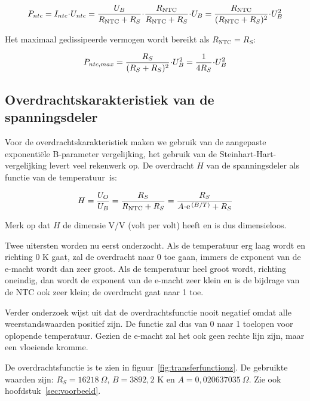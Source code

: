 \documentclass[12pt,a4paper,final,twoside,fleqn]{article}
\newcommand{\rntc}{R_\text{NTC}}
\let\oldcdot\cdot
\renewcommand{\cdot}{\kern-.10em\oldcdot\kern-.10em}
\begin{document}
\begin{equation}
P_{ntc} = I_{ntc}\cdot U_{ntc} = \dfrac{U_B}{\rntc+R_S}\cdot \dfrac{\rntc}{\rntc+R_S}\cdot U_B = \dfrac{\rntc}{(\rntc+R_S)^2}\cdot U_B^2
\end{equation} 

Het maximaal gedissipeerde vermogen wordt bereikt als $\rntc = R_S$:

\begin{equation}
P_{ntc,max} = \dfrac{R_S}{(R_S+R_S)^2}\cdot U_B^2 = \dfrac{1}{4R_S}\cdot U_B^2
\end{equation}

\subsection{Overdrachtskarakteristiek van de spanningsdeler}
Voor de overdrachtskarakteristiek maken we gebruik van de aangepaste exponenti\"ele
B-parameter vergelijking, het gebruik van de Steinhart-Hart-vergelijking
levert veel rekenwerk op.
De overdracht $H$ van de spanningsdeler als functie van de temperatuur~is:

\begin{equation}
\label{equ:transferh}
H = \dfrac{U_O}{U_B} = \dfrac{R_S}{\rntc + R_S}=\dfrac{R_S}{A\cdot\text{e}^{\,(B/T)}+R_S}
\end{equation}

Merk op dat $H$ de dimensie V/V (volt per volt) heeft en is dus dimensieloos.

Twee uitersten worden nu eerst onderzocht. Als de temperatuur erg laag wordt en
richting 0 K gaat, zal de overdracht naar 0 toe gaan, immers de exponent van de
e-macht wordt dan zeer groot. Als de temperatuur heel groot wordt, richting 
oneindig, dan wordt de exponent van de e-macht zeer klein en is de bijdrage van de
NTC ook zeer klein; de overdracht gaat naar 1 toe.

Verder onderzoek wijst uit dat de overdrachtsfunctie nooit negatief omdat alle
weerstandswaarden positief zijn. De functie zal dus van 0 naar 1 toelopen voor
oplopende temperatuur. Gezien de e-macht zal het ook geen rechte lijn zijn, maar
een vloeiende kromme.

De overdrachtsfunctie is te zien in figuur~\ref{fig:transferfunctionz}. De
gebruikte waarden zijn: $R_S = 16218\ \Omega$, $B = 3892,2$ K en
$A = 0,020637035\ \Omega$. Zie  ook hoofdstuk~\ref{sec:voorbeeld}.
\end{document}
